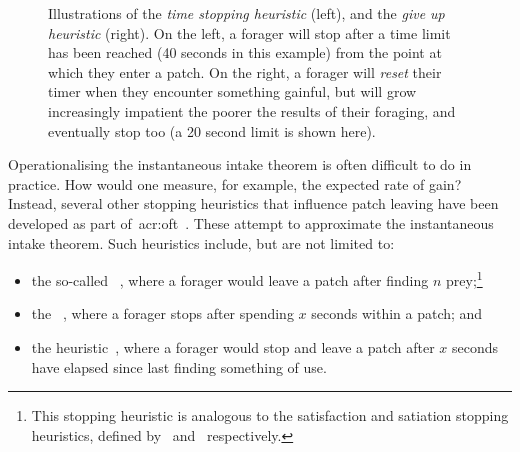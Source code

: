 \begin{figure}[t!]
    \centering
    \caption[Time-based stopping heuristics]{Illustrations of the \emph{time stopping heuristic} (left), and the \emph{give up heuristic} (right). On the left, a forager will stop after a time limit has been reached (40 seconds in this example) from the point at which they enter a patch. On the right, a forager will \emph{reset} their timer when they encounter something gainful, but will grow increasingly impatient the poorer the results of their foraging, and eventually stop too (a 20 second limit is shown here).}
    \label{fig:gut}
\end{figure}

Operationalising the instantaneous intake theorem is often difficult to do in practice. How would one measure, for example, the expected rate of gain? Instead, several other stopping heuristics that influence patch leaving have been developed as part of~\gls{acr:oft}~\citep{stephens1986foraging_theory}. These attempt to approximate the instantaneous intake theorem. Such heuristics include, but are not limited to:

\begin{itemize}
    \item{the so-called ~\citep{gibb1958number_rule}, where a forager would leave a patch after finding $n$ prey;\footnote{This stopping heuristic is analogous to the satisfaction and satiation stopping heuristics, defined by~\cite{cooper1973retrieval_effectiveness} and~\cite{simon1955satiation} respectively.}}
    
    \item{the ~\citep{charles1972behaviour, krebs1973time_rule}, where a forager stops after spending $x$ seconds within a patch; and}
    
    \item{the  heuristic~\citep{krebs1974leave_after_rule}, where a forager would stop and leave a patch after $x$ seconds have elapsed since last finding something of use.}
\end{itemize}

